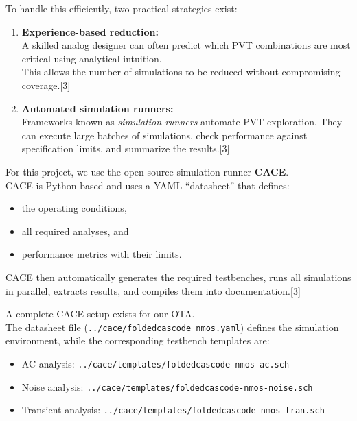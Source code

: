 \documentclass[
  11pt,
  a4paper,
  oneside]{scrbook}
\providecommand{\tightlist}{%
  \setlength{\itemsep}{0pt}\setlength{\parskip}{0pt}}
\begin{document}
To handle this efficiently, two practical strategies exist:

\begin{enumerate}
\def\labelenumi{\arabic{enumi}.}
\item
  \textbf{Experience-based reduction:}\\
  A skilled analog designer can often predict which PVT combinations are
  most critical using analytical intuition.\\
  This allows the number of simulations to be reduced without
  compromising coverage.{[}3{]}
\item
  \textbf{Automated simulation runners:}\\
  Frameworks known as \emph{simulation runners} automate PVT
  exploration. They can execute large batches of simulations, check
  performance against specification limits, and summarize the
  results.{[}3{]}
\end{enumerate}

For this project, we use the open-source simulation runner
\textbf{CACE}.\\
CACE is Python-based and uses a YAML ``datasheet'' that defines:

\begin{itemize}
\tightlist
\item
  the operating conditions,\\
\item
  all required analyses, and\\
\item
  performance metrics with their limits.
\end{itemize}

CACE then automatically generates the required testbenches, runs all
simulations in parallel, extracts results, and compiles them into
documentation.{[}3{]}

A complete CACE setup exists for our OTA.\\
The datasheet file (\texttt{../cace/foldedcascode\_nmos.yaml}) defines
the simulation environment, while the corresponding testbench templates
are:

\begin{itemize}
\tightlist
\item
  AC analysis: \texttt{../cace/templates/foldedcascode-nmos-ac.sch}
\item
  Noise analysis:
  \texttt{../cace/templates/foldedcascode-nmos-noise.sch}
\item
  Transient analysis:
  \texttt{../cace/templates/foldedcascode-nmos-tran.sch}
\end{itemize}
\end{document}
